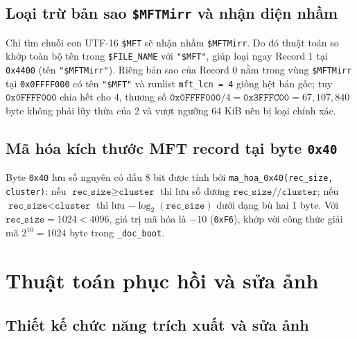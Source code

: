 \subsection{Loại trừ bản sao \texttt{\$MFTMirr} và nhận diện nhầm}

Chỉ tìm chuỗi con UTF-16 \texttt{\$MFT} sẽ nhận nhầm \texttt{\$MFTMirr}. Do đó thuật toán so khớp toàn bộ tên trong \texttt{\$FILE\_NAME} với \texttt{"\$MFT"}, giúp loại ngay Record 1 tại \texttt{0x4400} (tên \texttt{"\$MFTMirr"}). Riêng bản sao của Record 0 nằm trong vùng \texttt{\$MFTMirr} tại \texttt{0x0FFFF000} có tên \texttt{"\$MFT"} và runlist \texttt{mft\_lcn = 4} giống hệt bản gốc; tuy $\texttt{0x0FFFF000}$ chia hết cho 4, thương số $\texttt{0x0FFFF000} / 4 = \texttt{0x3FFFC00} = 67{,}107{,}840$ byte không phải lũy thừa của 2 và vượt ngưỡng 64 KiB nên bị loại chính xác.

\subsection{Mã hóa kích thước MFT record tại byte \texttt{0x40}}

Byte \texttt{0x40} lưu số nguyên có dấu 8 bit được tính bởi \texttt{ma\_hoa\_0x40(rec\_size, cluster)}: nếu $\texttt{rec\_size} \ge \texttt{cluster}$ thì lưu số dương $\texttt{rec\_size} \mathbin{//} \texttt{cluster}$; nếu $\texttt{rec\_size} < \texttt{cluster}$ thì lưu $-\log_2(\texttt{rec\_size})$ dưới dạng bù hai 1 byte. Với $\texttt{rec\_size} = 1024 < 4096$, giá trị mã hóa là $-10$ (\texttt{0xF6}), khớp với công thức giải mã $2^{10} = 1024$ byte trong \texttt{\_doc\_boot}.

\section{Thuật toán phục hồi và sửa ảnh}

\subsection{Thiết kế chức năng trích xuất và sửa ảnh}

